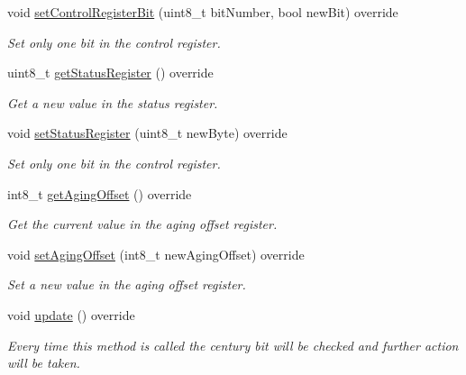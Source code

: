 \begin{DoxyCompactItemize}
void \mbox{\hyperlink{class_d_s3231_a9ed1255adb58ecd03a541a4d481496c4}{set\+Control\+Register\+Bit}} (uint8\+\_\+t bit\+Number, bool new\+Bit) override
\begin{DoxyCompactList}\small\item\em Set only one bit in the control register. \end{DoxyCompactList}\item 
uint8\+\_\+t \mbox{\hyperlink{class_d_s3231_aee77c6ecb3c292d375eebe7e58ebb024}{get\+Status\+Register}} () override
\begin{DoxyCompactList}\small\item\em Get a new value in the status register. \end{DoxyCompactList}\item 
void \mbox{\hyperlink{class_d_s3231_a303a9a5123f66987e209396d60e329e8}{set\+Status\+Register}} (uint8\+\_\+t new\+Byte) override
\begin{DoxyCompactList}\small\item\em Set only one bit in the control register. \end{DoxyCompactList}\item 
int8\+\_\+t \mbox{\hyperlink{class_d_s3231_a94e9f40f1b453dc4d8894b63bc0ec7d6}{get\+Aging\+Offset}} () override
\begin{DoxyCompactList}\small\item\em Get the current value in the aging offset register. \end{DoxyCompactList}\item 
void \mbox{\hyperlink{class_d_s3231_a0a9dc2668139654b261c2feeb1d6e663}{set\+Aging\+Offset}} (int8\+\_\+t new\+Aging\+Offset) override
\begin{DoxyCompactList}\small\item\em Set a new value in the aging offset register. \end{DoxyCompactList}\item 
void \mbox{\hyperlink{class_d_s3231_a143ec57122d892ea0ec671a153352f2c}{update}} () override
\begin{DoxyCompactList}\small\item\em Every time this method is called the century bit will be checked and further action will be taken. \end{DoxyCompactList}\end{DoxyCompactItemize}
